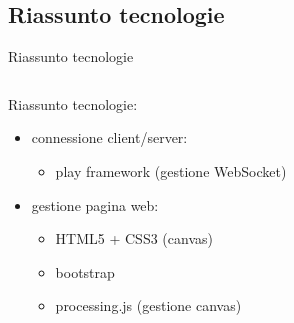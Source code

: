 \subsection{Riassunto tecnologie}
\begin{frame}{Riassunto tecnologie}
	\only<1>
	{
		\begin{columns}
			\begin{column}{0.7\textwidth}
				Riassunto tecnologie:
				\begin{itemize}
					\item{\footnotesize{connessione client/server:}}
					\begin{itemize}
						\item{\scriptsize{play framework (gestione WebSocket)}}
					\end{itemize}
					\item{\footnotesize{gestione pagina web:}}
					\begin{itemize}
						\item{\scriptsize{HTML5 + CSS3 (canvas)}}
						\item{\scriptsize{bootstrap}}
						\item{\scriptsize{processing.js (gestione canvas)}}
					\end{itemize}
				\end{itemize}
			\end{column}
			\begin{column}{0.3\textwidth}
				\centering

\end{column}
\end{columns}}
\end{frame}
